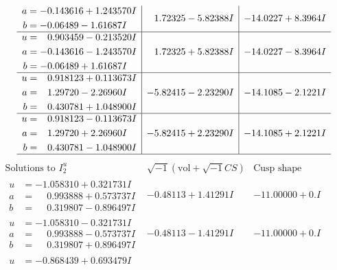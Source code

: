 \documentclass[1p]{elsarticle_modified}
\theoremstyle{definition}
\newcommand{\I}{\sqrt{-1}}
\begin{document}
$$\begin{array}{c|c|c}
\begin{aligned}
a &= -0.143616 + 1.243570 I \\
b &= -0.06489 - 1.61687 I\end{aligned}
 & \phantom{-}1.72325 - 5.82388 I & -14.0227 + 8.3964 I \\ \hline\begin{aligned}
u &= \phantom{-}0.903459 - 0.213520 I \\
a &= -0.143616 - 1.243570 I \\
b &= -0.06489 + 1.61687 I\end{aligned}
 & \phantom{-}1.72325 + 5.82388 I & -14.0227 - 8.3964 I \\ \hline\begin{aligned}
u &= \phantom{-}0.918123 + 0.113673 I \\
a &= \phantom{-}1.29720 - 2.26960 I \\
b &= \phantom{-}0.430781 + 1.048900 I\end{aligned}
 & -5.82415 - 2.23290 I & -14.1085 - 2.1221 I \\ \hline\begin{aligned}
u &= \phantom{-}0.918123 - 0.113673 I \\
a &= \phantom{-}1.29720 + 2.26960 I \\
b &= \phantom{-}0.430781 - 1.048900 I\end{aligned}
 & -5.82415 + 2.23290 I & -14.1085 + 2.1221 I\\
 \hline 
 \end{array}$$\newpage$$\begin{array}{c|c|c}  
\text{Solutions to }I^u_{2}& \I (\text{vol} + \sqrt{-1}CS) & \text{Cusp shape}\\
 \hline 
\begin{aligned}
u &= -1.058310 + 0.321731 I \\
a &= \phantom{-}0.993888 + 0.573737 I \\
b &= \phantom{-}0.319807 - 0.896497 I\end{aligned}
 & -0.48113 + 1.41291 I & -11.00000 + 0. I\phantom{ +0.000000I} \\ \hline\begin{aligned}
u &= -1.058310 - 0.321731 I \\
a &= \phantom{-}0.993888 - 0.573737 I \\
b &= \phantom{-}0.319807 + 0.896497 I\end{aligned}
 & -0.48113 - 1.41291 I & -11.00000 + 0. I\phantom{ +0.000000I} \\ \hline\begin{aligned}
u &= -0.868439 + 0.693479 I \\

\end{aligned}
\end{array}$$
\end{document}
